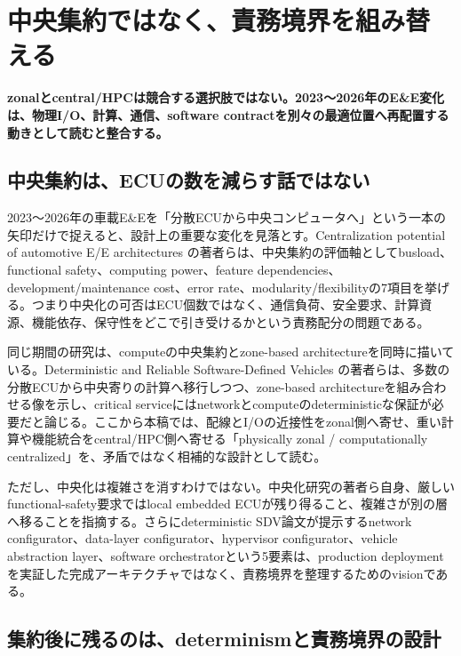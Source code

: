 \section{中央集約ではなく、責務境界を組み替える}
\noindent\textbf{zonalとcentral/HPCは競合する選択肢ではない。2023〜2026年のE\&E変化は、物理I/O、計算、通信、software contractを別々の最適位置へ再配置する動きとして読むと整合する。}\autocite{src-d5d5a7ec3f4c,src-e34d32d330e6}

\begin{surveyarticlebody}
\subsection{中央集約は、ECUの数を減らす話ではない}

2023〜2026年の車載E\&Eを「分散ECUから中央コンピュータへ」という一本の矢印だけで捉えると、設計上の重要な変化を見落とす。Centralization potential of automotive E/E architectures の著者らは、中央集約の評価軸としてbusload、functional safety、computing power、feature dependencies、development/maintenance cost、error rate、modularity/flexibilityの7項目を挙げる。つまり中央化の可否はECU個数ではなく、通信負荷、安全要求、計算資源、機能依存、保守性をどこで引き受けるかという責務配分の問題である。\autocite{src-6d738dbdfc39}

同じ期間の研究は、computeの中央集約とzone-based architectureを同時に描いている。Deterministic and Reliable Software-Defined Vehicles の著者らは、多数の分散ECUから中央寄りの計算へ移行しつつ、zone-based architectureを組み合わせる像を示し、critical serviceにはnetworkとcomputeのdeterministicな保証が必要だと論じる。ここから本稿では、配線とI/Oの近接性をzonal側へ寄せ、重い計算や機能統合をcentral/HPC側へ寄せる「physically zonal / computationally centralized」を、矛盾ではなく相補的な設計として読む。\autocite{src-e34d32d330e6}

ただし、中央化は複雑さを消すわけではない。中央化研究の著者ら自身、厳しいfunctional-safety要求ではlocal embedded ECUが残り得ること、複雑さが別の層へ移ることを指摘する。さらにdeterministic SDV論文が提示するnetwork configurator、data-layer configurator、hypervisor configurator、vehicle abstraction layer、software orchestratorという5要素は、production deploymentを実証した完成アーキテクチャではなく、責務境界を整理するためのvisionである。\autocite{src-d5d5a7ec3f4c,src-e34d32d330e6}

\subsection{集約後に残るのは、determinismと責務境界の設計}


\end{surveyarticlebody}
